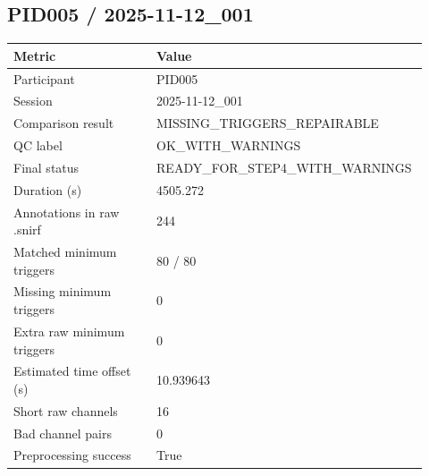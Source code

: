 \subsection*{PID005 / 2025-11-12\_001}
\begin{tabular}{p{0.34\linewidth}p{0.58\linewidth}}
\toprule
Metric & Value\\
\midrule
Participant & PID005\\
Session & 2025-11-12\_001\\
Comparison result & MISSING\_TRIGGERS\_REPAIRABLE\\
QC label & OK\_WITH\_WARNINGS\\
Final status & READY\_FOR\_STEP4\_WITH\_WARNINGS\\
Duration (s) & 4505.272\\
Annotations in raw .snirf & 244\\
Matched minimum triggers & 80 / 80\\
Missing minimum triggers & 0\\
Extra raw minimum triggers & 0\\
Estimated time offset (s) & 10.939643\\
Short raw channels & 16\\
Bad channel pairs & 0\\
Preprocessing success & True\\
\bottomrule
\end{tabular}
